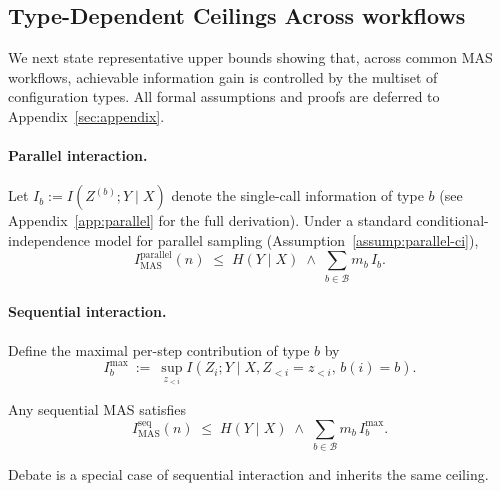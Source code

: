 \documentclass{article}
\theoremstyle{plain}
\theoremstyle{definition}
\theoremstyle{remark}
\begin{document}
\subsection{Type-Dependent Ceilings Across workflows}
\label{sec:type_upper_bounds}

We next state representative upper bounds showing that, across common MAS workflows, achievable information gain is controlled by the multiset of configuration types.
All formal assumptions and proofs are deferred to Appendix~\ref{sec:appendix}.

\vspace{-0.2cm}
\paragraph{Parallel interaction.}
Let $I_b := I(Z^{(b)};Y\mid X)$ denote the single-call information of type $b$ (see Appendix~\ref{app:parallel} for the full derivation).
Under a standard conditional-independence model for parallel sampling (Assumption~\ref{assump:parallel-ci}),
\begin{equation}
I_{\mathrm{MAS}}^{\mathrm{parallel}}(n)
\;\le\;
H(Y\mid X) \;\wedge\; \sum_{b\in\mathcal{B}} m_b\, I_b.
\label{eq:parallel_upper_main}
\end{equation}

\vspace{-0.2cm}

\paragraph{Sequential interaction.}
Define the maximal per-step contribution of type $b$ by
\vspace{-0.2cm}
\begin{equation}
I_b^{\max}
~:=~
\sup_{z_{<i}}
I(Z_i;Y\mid X,Z_{<i}=z_{<i},\, b(i)=b).
\label{eq:imax_main}
\end{equation}

\vspace{-0.2cm}
Any sequential MAS satisfies
\vspace{-0.2cm}
\begin{equation}
I_{\mathrm{MAS}}^{\mathrm{seq}}(n)
\;\le\;
H(Y\mid X) \;\wedge\; \sum_{b\in\mathcal{B}} m_b\, I_b^{\max}.
\label{eq:sequential_upper_main}
\end{equation}

\vspace{-0.4cm}
Debate is a special case of sequential interaction and inherits the same ceiling.
\end{document}

